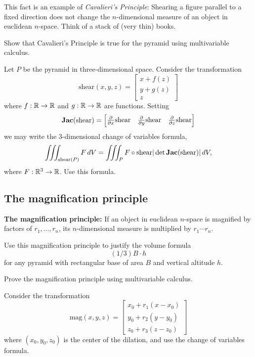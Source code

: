 \documentclass[hints,handout,noauthor,nooutcomes,12pt,newpage]{ximera}
\begin{document}
This fact is an example of \textit{Cavalieri's Principle}: Shearing a
figure parallel to a fixed direction does not change the
$n$-dimensional measure of an object in euclidean $n$-space. Think of
a stack of (very thin) books. 






\begin{problem}
Show that Cavalieri's Principle is true for the pyramid using
multivariable calculus.

\begin{hint}
Let $P$ be the pyramid in three-dimensional space. Consider the transformation%
\[
\mathrm{shear}(x,y,z)=
\begin{bmatrix}
x+ f(z)\\
y+g(z)\\
z
\end{bmatrix}
\]
where $f:\mathbb R\to\mathbb R$ and $g:\mathbb R\to\mathbb R$ are functions. Setting
\[
\mathbf{Jac}(\mathrm{shear}) =
\begin{bmatrix}
  \frac{\partial}{\partial x}\mathrm{shear} &  \frac{\partial}{\partial y}\mathrm{shear}   & \frac{\partial}{\partial z}\mathrm{shear} 
\end{bmatrix}
\]
we may write the 3-dimensional change of variables formula,
\[
\iiint_{\mathrm{shear}(P)} F \,d V=\iiint_P F\circ \mathrm{shear} |\det \mathbf{Jac}(\mathrm{shear}) | \, dV,
\]
where $F:\mathbb R^3\to\mathbb R$.  Use this formula.
\end{hint}



\end{problem}

\subsection{The magnification principle}

\textbf{The magnification principle:} If an object in euclidean $n$-space is
magnified by factors of $r_{1},\ldots,r_{n}$, its $n$-dimensional
measure is multiplied by $r_{1}\cdots r_{n}$.

\begin{problem}
Use this magnification principle to justify the volume formula%
\[
(1/3)B\cdot h
\]
for any pyramid with rectangular base of area $B$ and vertical altitude $h$.
\end{problem}

\begin{problem}
Prove the magnification principle using multivariable calculus.

\begin{hint}
Consider the transformation%
\[
\mathrm{mag}(x,y,z)=
\begin{bmatrix}
x_0 + r_{1} (x-x_0) \\
y_0 + r_2 (y-y_0)\\
z_0 + r_3 (z-z_0)
\end{bmatrix}
\]
where $(x_0,y_0,z_0)$ is the center of the dilation, and use the
change of variables formula.
\end{hint}
\end{problem}
\end{document}
